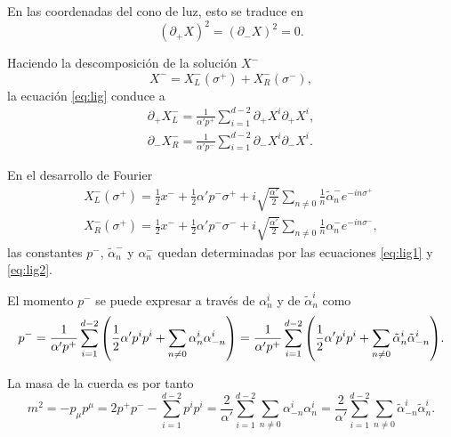 En las coordenadas del cono de luz, esto se traduce en
\begin{equation}
  (\partial_+ X)^2 = (\partial_- X)^2 = 0.
  \label{eq:lig}
\end{equation}

Haciendo la descomposición de la solución $X^-$ 
\begin{equation}
  X^-=X^-_L(\sigma^+)+X^-_R(\sigma^-),
\end{equation}
la ecuación \ref{eq:lig} conduce a 
  \begin{align}
    \partial_+ X_L^- = \frac{1}{\alpha'p^+}\sum_{i=1}^{d-2} \partial_+ X^i \partial_+ X^i, \label{eq:lig1}\\
    \partial_- X_R^- = \frac{1}{\alpha'p^-}\sum_{i=1}^{d-2} \partial_- X^i \partial_- X^i. \label{eq:lig2}
  \end{align}

En el desarrollo de Fourier
\begin{equation}
  \begin{gathered}
    X^-_L(\sigma^+)=\frac 1 2 x^- + \frac 1 2 \alpha' p^- \sigma^+ + i\sqrt{\frac{ \alpha'}{ 2}}
    \sum_{n\neq0} \frac 1 n \tilde{\alpha}^-_n e^{-in\sigma^+} \\                             
    X^-_R(\sigma^+)=\frac 1 2 x^- + \frac 1 2 \alpha' p^- \sigma^- + i\sqrt{\frac{ \alpha'}{ 2}}
    \sum_{n\neq0} \frac 1 n \alpha^-_n e^{-in\sigma^-},
  \end{gathered}
\end{equation}
las constantes $p^-$, $\tilde \alpha^-_n$ y $\alpha^-_n$ quedan determinadas por las ecuaciones
\ref{eq:lig1} y \ref{eq:lig2}.

El momento $p^-$ se puede expresar a través de $\alpha^i_n$ y de $\tilde \alpha^i_n$ como
\begin{equation}
  p^- = \frac{1}{\alpha' p^+}\sum_{i=1}^{d-2} \qty(\frac{1}{2}\alpha'p^i p^i +\sum_{n\neq0}\alpha_n^i\alpha_{-n}^i) 
   = \frac{1}{\alpha' p^+}\sum_{i=1}^{d-2} \qty(\frac{1}{2}\alpha'p^i p^i +\sum_{n\neq0}\tilde \alpha_n^i\tilde \alpha_{-n}^i) .
\end{equation}

La masa de la cuerda es por tanto
\begin{equation}
  m^2=-p_\mu p^\mu = 2p^+p^- - \sum_{i=1}^{d-2} p^i p^i = 
  \frac{2}{\alpha'}\sum_{i=1}^{d-2} \sum_{n\neq 0} \alpha_{-n}^i \alpha_n^i
  =\frac{2}{\alpha'}\sum_{i=1}^{d-2} \sum_{n\neq 0}\tilde \alpha_{-n}^i \tilde\alpha_n^i.
  \label{eq:mass}
\end{equation}

